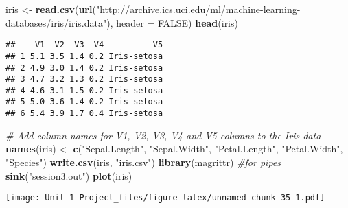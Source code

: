 \documentclass[
]{article}
\newenvironment{Shaded}{\begin{snugshade}}{\end{snugshade}}
\newcommand{\AttributeTok}[1]{\textcolor[rgb]{0.13,0.29,0.53}{#1}}
\newcommand{\CommentTok}[1]{\textcolor[rgb]{0.56,0.35,0.01}{\textit{#1}}}
\newcommand{\ConstantTok}[1]{\textcolor[rgb]{0.56,0.35,0.01}{#1}}
\newcommand{\FunctionTok}[1]{\textcolor[rgb]{0.13,0.29,0.53}{\textbf{#1}}}
\newcommand{\NormalTok}[1]{#1}
\newcommand{\OtherTok}[1]{\textcolor[rgb]{0.56,0.35,0.01}{#1}}
\newcommand{\SpecialCharTok}[1]{\textcolor[rgb]{0.81,0.36,0.00}{\textbf{#1}}}
\newcommand{\StringTok}[1]{\textcolor[rgb]{0.31,0.60,0.02}{#1}}
\begin{document}
\begin{Shaded}
\begin{Highlighting}[]
\NormalTok{iris }\OtherTok{\textless{}{-}} \FunctionTok{read.csv}\NormalTok{(}\FunctionTok{url}\NormalTok{(}\StringTok{"http://archive.ics.uci.edu/ml/machine{-}learning{-}databases/iris/iris.data"}\NormalTok{), }\AttributeTok{header =} \ConstantTok{FALSE}\NormalTok{)}
\FunctionTok{head}\NormalTok{(iris)}
\end{Highlighting}
\end{Shaded}

\begin{verbatim}
##    V1  V2  V3  V4          V5
## 1 5.1 3.5 1.4 0.2 Iris-setosa
## 2 4.9 3.0 1.4 0.2 Iris-setosa
## 3 4.7 3.2 1.3 0.2 Iris-setosa
## 4 4.6 3.1 1.5 0.2 Iris-setosa
## 5 5.0 3.6 1.4 0.2 Iris-setosa
## 6 5.4 3.9 1.7 0.4 Iris-setosa
\end{verbatim}

\begin{Shaded}
\begin{Highlighting}[]
\CommentTok{\# Add column names for V1, V2, V3, V4 and V5 columns to the Iris data}
\FunctionTok{names}\NormalTok{(iris) }\OtherTok{\textless{}{-}} \FunctionTok{c}\NormalTok{(}\StringTok{"Sepal.Length"}\NormalTok{, }\StringTok{"Sepal.Width"}\NormalTok{, }\StringTok{"Petal.Length"}\NormalTok{,}
\StringTok{"Petal.Width"}\NormalTok{, }\StringTok{"Species"}\NormalTok{)}
\FunctionTok{write.csv}\NormalTok{(iris, }\StringTok{"iris.csv"}\NormalTok{)}
\FunctionTok{library}\NormalTok{(magrittr) }\CommentTok{\#for pipes}
\FunctionTok{sink}\NormalTok{(}\StringTok{"session3.out"}\NormalTok{)}
\FunctionTok{plot}\NormalTok{(iris)}
\end{Highlighting}
\end{Shaded}

\texttt{[image: Unit-1-Project\_files/figure-latex/unnamed-chunk-35-1.pdf]}

\begin{Shaded}
\end{Shaded}
\end{document}
